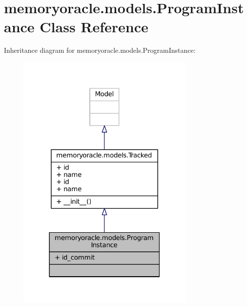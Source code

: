 \hypertarget{classmemoryoracle_1_1models_1_1ProgramInstance}{}\section{memoryoracle.\+models.\+Program\+Instance Class Reference}
\label{classmemoryoracle_1_1models_1_1ProgramInstance}


Inheritance diagram for memoryoracle.\+models.\+Program\+Instance\+:
\nopagebreak
\begin{figure}[H]
\begin{center}
\leavevmode
\includegraphics[width=249pt]{classmemoryoracle_1_1models_1_1ProgramInstance__inherit__graph}
\end{center}
\end{figure}


